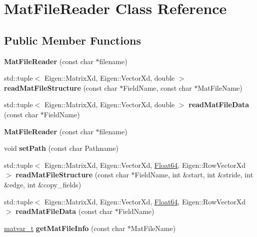 \hypertarget{class_mat_file_reader}{}\section{Mat\+File\+Reader Class Reference}
\label{class_mat_file_reader}
\subsection*{Public Member Functions}
\begin{DoxyCompactItemize}
\item 
\mbox{\label{class_mat_file_reader_aad136aff8215618eff5e3390b374e61a}} 
{\bfseries Mat\+File\+Reader} (const char $\ast$filename)
\item 
\mbox{\label{class_mat_file_reader_a09b11a406b4f2224d09a35edae75bfbc}} 
std\+::tuple$<$ Eigen\+::\+Matrix\+Xd, Eigen\+::\+Vector\+Xd, double $>$ {\bfseries read\+Mat\+File\+Structure} (const char $\ast$Field\+Name, const char $\ast$Mat\+File\+Name)
\item 
\mbox{\label{class_mat_file_reader_ab5269caf1a7e2c213f6daf56c7d14321}} 
std\+::tuple$<$ Eigen\+::\+Matrix\+Xd, Eigen\+::\+Vector\+Xd, double $>$ {\bfseries read\+Mat\+File\+Data} (const char $\ast$Field\+Name)
\item 
\mbox{\label{class_mat_file_reader_aad136aff8215618eff5e3390b374e61a}} 
{\bfseries Mat\+File\+Reader} (const char $\ast$filename)
\item 
\mbox{\label{class_mat_file_reader_af1425adbbaf5900fe70342eb1c7a750a}} 
void {\bfseries set\+Path} (const char Pathname)
\item 
\mbox{\label{class_mat_file_reader_a348e33866c02d6bfe3be63ad34871025}} 
std\+::tuple$<$ Eigen\+::\+Matrix\+Xd, Eigen\+::\+Vector\+Xd, \hyperlink{group___tools_ga3f1431cb9f76da10f59246d1d743dc2c}{Float64}, Eigen\+::\+Row\+Vector\+Xd $>$ {\bfseries read\+Mat\+File\+Structure} (const char $\ast$Field\+Name, int \&start, int \&stride, int \&edge, int \&copy\+\_\+fields)
\item 
\mbox{\label{class_mat_file_reader_a683f2b30f40a9da145c6706319213a38}} 
std\+::tuple$<$ Eigen\+::\+Matrix\+Xd, Eigen\+::\+Vector\+Xd, \hyperlink{group___tools_ga3f1431cb9f76da10f59246d1d743dc2c}{Float64}, Eigen\+::\+Row\+Vector\+Xd $>$ {\bfseries read\+Mat\+File\+Data} (const char $\ast$Field\+Name)
\item 
\mbox{\label{class_mat_file_reader_a358cf61a557c68d56a2ee9f23773e46c}} 
\hyperlink{group___m_a_t_structmatvar__t}{matvar\+\_\+t} {\bfseries get\+Mat\+File\+Info} (const char $\ast$Mat\+File\+Name)
\end{DoxyCompactItemize}


